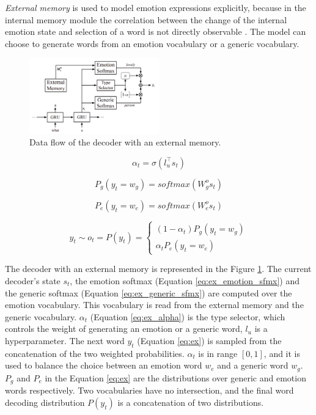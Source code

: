 \textit{External memory} is used to model emotion expressions explicitly, because in the internal memory module the correlation between the change of the internal emotion state and selection of a word is not directly observable \cite{xu2008constructing}. The model can choose to generate words from an emotion vocabulary or a generic vocabulary.

\begin{figure}[H]
  \centering
  \includegraphics[width=0.5\textwidth]{figures/external_memory.png}
  \caption{Data flow of the decoder with an external memory.}
  \label{fig:external_memory}
\end{figure}

\begin{equation} \label{eq:ex_alpha}
\alpha_t = \sigma(l_u^\intercal s_t)
\end{equation}

\begin{equation} \label{eq:ex_emotion_sfmx}
P_g(y_t = w_g) = softmax(W_g^o s_t)
\end{equation}

\begin{equation} \label{eq:ex_generic_sfmx}
P_e(y_t = w_e) = softmax(W_e^o s_t)
\end{equation}

\begin{equation}\label{eq:ex}
y_t \sim o_t = P(y_t) = \begin{cases} (1-\alpha_t)P_g(y_t = w_g) \\ \alpha_tP_e(y_t = w_e) \end{cases}
\end{equation}

The decoder with an external memory is represented in the Figure \ref{fig:external_memory}. The current decoder's state $s_t$, the emotion softmax (Equation \ref{eq:ex_emotion_sfmx}) and the generic softmax (Equation \ref{eq:ex_generic_sfmx}) are computed over the emotion vocabulary. This vocabulary is read from the external memory and the generic vocabulary. $\alpha_t$ (Equation \ref{eq:ex_alpha}) is the type selector, which controls the weight of generating an emotion or a generic word, $l_u$ is a hyperparameter. The next word $y_t$ (Equation \ref{eq:ex}) is sampled from the concatenation of the two weighted probabilities. $\alpha_t$ is in range $[0,1]$, and it is used to balance the choice between an emotion word $w_e$ and a generic word $w_g$. $P_g$ and $P_e$ in the Equation \ref{eq:ex} are the distributions over generic and emotion words respectively. Two vocabularies have no intersection, and the final word decoding distribution $P(y_t)$ is a concatenation of two distributions.

